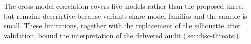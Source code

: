 The cross-model correlation covers five models rather than the proposed
three, but remains descriptive because variants share model families and the
sample is small. These limitations, together with the replacement of the
silhouette after validation, bound the interpretation of the delivered audit
(\cref{sec:disc-threats}).

%
